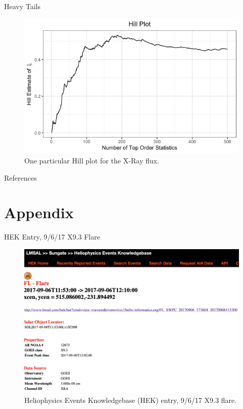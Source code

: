 \documentclass{beamer}
\begin{document}
\begin{frame}{Heavy Tails}
    \begin{figure}
        \centering
        \includegraphics[scale=0.5]{hill_plot.png}
        \caption{One particular Hill plot for the X-Ray flux.}
        \label{fig:hill_plot}
    \end{figure}
\end{frame}

\begin{frame}[allowframebreaks]{References}
    \printbibliography
\end{frame}

\section{Appendix}

\begin{frame}{HEK Entry, 9/6/17 X9.3 Flare}
    \begin{figure}
        \centering
        \includegraphics[scale=0.3]{hek_entry_20170906.png}
        \caption{Heliophysics Events Knowledgebase (HEK) entry, 9/6/17 X9.3 flare.}
        \label{fig:hek_entry}
    \end{figure}
\end{frame}
\end{document}
